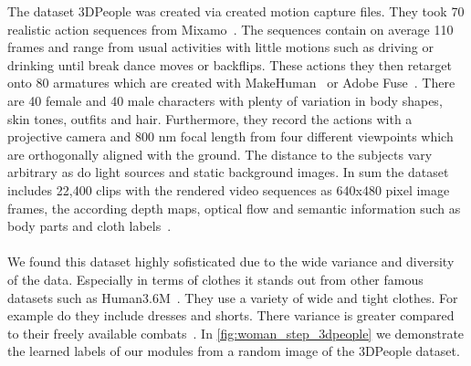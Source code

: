 The dataset 3DPeople was created via created motion capture files.
They took 70 realistic action sequences from Mixamo~\cite{mixamomotionpac}.
The sequences contain on average 110 frames and range from usual activities with little motions such as driving
or drinking until break dance moves or backflips.
These actions they then retarget onto 80 armatures which are created with MakeHuman~\cite{makehuman} or Adobe
Fuse~\cite{adobefuse}.
There are 40 female and 40 male characters with plenty of variation in body shapes, skin tones, outfits and hair.
Furthermore, they record the actions with a projective camera and 800 nm focal length from four different viewpoints
which are orthogonally aligned with the ground.
The distance to the subjects vary arbitrary as do light sources and static background images.
In sum the dataset includes 22,400 clips with the rendered video sequences as 640x480 pixel image frames, the according
depth maps, optical flow and semantic information such as body parts and cloth labels~\cite{3dpeople}.
\\\mbox{}\\
We found this dataset highly sofisticated due to the wide variance and diversity of the data.
Especially in terms of clothes it stands out from other famous datasets such as Human3.6M~\cite{humaneva}.
They use a variety of wide and tight clothes. For example do they include dresses and shorts.
There variance is greater compared to their freely available combats~\cite{human36m, humaneva}.
In \autoref{fig:woman_step_3dpeople} we demonstrate the learned labels of our modules from a random image of the
3DPeople dataset.





